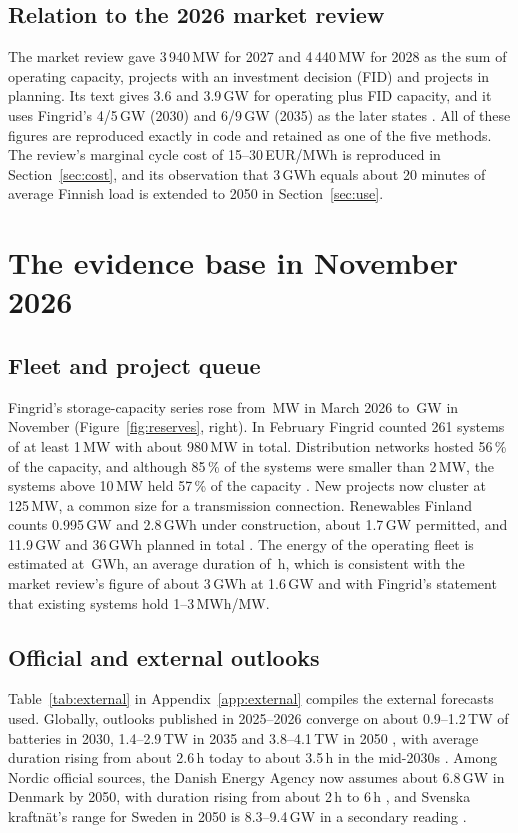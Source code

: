 \documentclass[11pt]{article}
\newcommand{\EUR}{EUR}
\begin{document}
\subsection{Relation to the 2026 market review}
The market review gave 3\,940\,MW for 2027 and 4\,440\,MW for 2028 as the sum of operating capacity, projects with an investment decision (FID) and projects in planning. Its text gives 3.6 and 3.9\,GW for operating plus FID capacity, and it uses Fingrid's 4/5\,GW (2030) and 6/9\,GW (2035) as the later states \citep{merilehto2026blog}.
All of these figures are reproduced exactly in code and retained as one of the five methods.
The review's marginal cycle cost of 15--30\,\EUR/MWh is reproduced in Section~\ref{sec:cost}, and its observation that 3\,GWh equals about 20 minutes of average Finnish load is extended to 2050 in Section~\ref{sec:use}.

\section{The evidence base in November 2026}\label{sec:evidence}

\subsection{Fleet and project queue}
Fingrid's storage-capacity series rose from \,MW in March 2026 to \,GW in November (Figure~\ref{fig:reserves}, right).
In February Fingrid counted 261 systems of at least 1\,MW with about 980\,MW in total. Distribution networks hosted 56\,\% of the capacity, and although 85\,\% of the systems were smaller than 2\,MW, the systems above 10\,MW held 57\,\% of the capacity \citep{fingrid2026storage}.
New projects now cluster at 125\,MW, a common size for a transmission connection.
Renewables Finland counts 0.995\,GW and 2.8\,GWh under construction, about 1.7\,GW permitted, and 11.9\,GW and 36\,GWh planned in total \citep{renewablesfi2026bess}.
The energy of the operating fleet is estimated at \,GWh, an average duration of \,h, which is consistent with the market review's figure of about 3\,GWh at 1.6\,GW and with Fingrid's statement that existing systems hold 1--3\,MWh/MW.

\subsection{Official and external outlooks}\label{sec:external}
Table~\ref{tab:external} in Appendix~\ref{app:external} compiles the external forecasts used.
Globally, outlooks published in 2025--2026 converge on about 0.9--1.2\,TW of batteries in 2030, 1.4--2.9\,TW in 2035 and 3.8--4.1\,TW in 2050 \citep{iea2025weo,bnef2026neo,irena2024weto}, with average duration rising from about 2.6\,h today to about 3.5\,h in the mid-2030s \citep{cnesa2026white,bnef2026esmo}.
Among Nordic official sources, the Danish Energy Agency now assumes about 6.8\,GW in Denmark by 2050, with duration rising from about 2\,h to 6\,h \citep{dea2025af25}, and Svenska kraftnät's range for Sweden in 2050 is 8.3--9.4\,GW in a secondary reading \citep{svk2026lma}.
\end{document}
